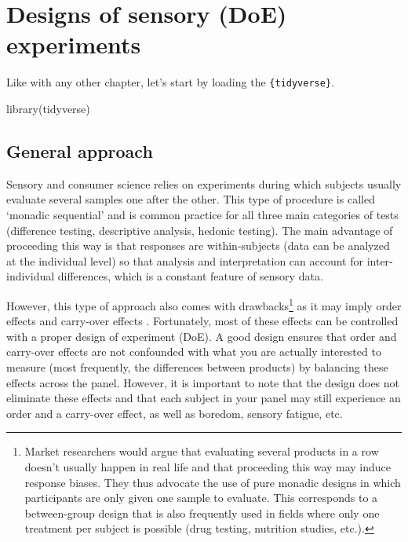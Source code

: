 \documentclass[
]{krantz}
\makeatletter
\newenvironment{Shaded}{\begin{snugshade}}{\end{snugshade}}
\newcommand{\FunctionTok}[1]{\textcolor[rgb]{0,0,0}{#1}}
\newcommand{\NormalTok}[1]{#1}
\newenvironment{kframe}{%
\medskip{}
\setlength{\fboxsep}{.8em}
 \def\at@end@of@kframe{}%
 \ifinner\ifhmode%
  \def\at@end@of@kframe{\end{minipage}}%
  \begin{minipage}{\columnwidth}%
 \fi\fi%
 \def\FrameCommand##1{\hskip\@totalleftmargin \hskip-\fboxsep
 \colorbox{shadecolor}{##1}\hskip-\fboxsep
     \hskip-\linewidth \hskip-\@totalleftmargin \hskip\columnwidth}%
 \MakeFramed {\advance\hsize-\width
   \@totalleftmargin\z@ \linewidth\hsize
   \@setminipage}}%
 {\par\unskip\endMakeFramed%
 \at@end@of@kframe}
\renewenvironment{Shaded}{\begin{kframe}}{\end{kframe}}
\makeatother
\begin{document}
\hypertarget{designs-of-sensory-doe-experiments}{%
\section{Designs of sensory (DoE) experiments}\label{designs-of-sensory-doe-experiments}}

Like with any other chapter, let's start by loading the \texttt{\{tidyverse\}}.

\begin{Shaded}
\begin{Highlighting}[]
\FunctionTok{library}\NormalTok{(tidyverse)}
\end{Highlighting}
\end{Shaded}

\hypertarget{general-approach}{%
\subsection{General approach}\label{general-approach}}

Sensory and consumer science relies on experiments during which subjects usually evaluate several samples one after the other. This type of procedure is called `monadic sequential' and is common practice for all three main categories of tests (difference testing, descriptive analysis, hedonic testing). The main advantage of proceeding this way is that responses are within-subjects (data can be analyzed at the individual level) so that analysis and interpretation can account for inter-individual differences, which is a constant feature of sensory data.

However, this type of approach also comes with drawbacks\footnote{Market researchers would argue that evaluating several products in a row doesn't usually happen in real life and that proceeding this way may induce response biases. They thus advocate the use of pure monadic designs in which participants are only given one sample to evaluate. This corresponds to a between-group design that is also frequently used in fields where only one treatment per subject is possible (drug testing, nutrition studies, etc.).} as it may imply order effects and carry-over effects \citep{Macfie1989}. Fortunately, most of these effects can be controlled with a proper design of experiment (DoE). A good design ensures that order and carry-over effects are not confounded with what you are actually interested to measure (most frequently, the differences between products) by balancing these effects across the panel. However, it is important to note that the design does not eliminate these effects and that each subject in your panel may still experience an order and a carry-over effect, as well as boredom, sensory fatigue, etc.
\end{document}
